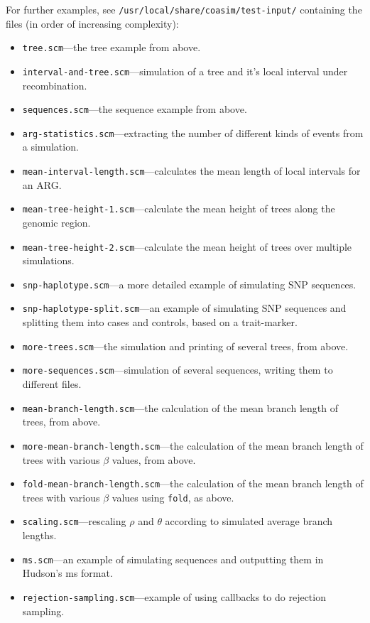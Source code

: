 \documentclass{manual}
\begin{document}
For further examples, see \verb?/usr/local/share/coasim/test-input/?
containing the files (in order of increasing complexity):
\begin{itemize}
\item \texttt{tree.scm}---the tree example from above.
\item \texttt{interval-and-tree.scm}---simulation of a tree and it's
  local interval under recombination.
\item \texttt{sequences.scm}---the sequence example from above.
\item \texttt{arg-statistics.scm}---extracting the number of different
  kinds of events from a simulation.
\item \texttt{mean-interval-length.scm}---calculates the mean length
  of local intervals for an ARG.
\item \texttt{mean-tree-height-1.scm}---calculate the mean height of
  trees along the genomic region.
\item \texttt{mean-tree-height-2.scm}---calculate the mean height of
  trees over multiple simulations.
\item \texttt{snp-haplotype.scm}---a more detailed example of
  simulating SNP sequences.
\item \texttt{snp-haplotype-split.scm}---an example of
  simulating SNP sequences and splitting them into cases and controls,
  based on a trait-marker.
\item \texttt{more-trees.scm}---the simulation and printing of several
  trees, from above.
\item \texttt{more-sequences.scm}---simulation of several sequences,
  writing them to different files.
\item \texttt{mean-branch-length.scm}---the calculation of the mean branch
  length of trees, from above.
\item \texttt{more-mean-branch-length.scm}---the calculation of the mean branch
  length of trees with various $\beta$ values, from above.
\item \texttt{fold-mean-branch-length.scm}---the calculation of the mean branch
  length of trees with various $\beta$ values using \texttt{fold}, as
  above.
\item \texttt{scaling.scm}---rescaling $\rho$ and $\theta$ according
  to simulated average branch lengths.
\item \texttt{ms.scm}---an example of simulating sequences and
  outputting them in Hudson's ms format.
\item \texttt{rejection-sampling.scm}---example of using callbacks to
  do rejection sampling.
\end{itemize}
\end{document}
